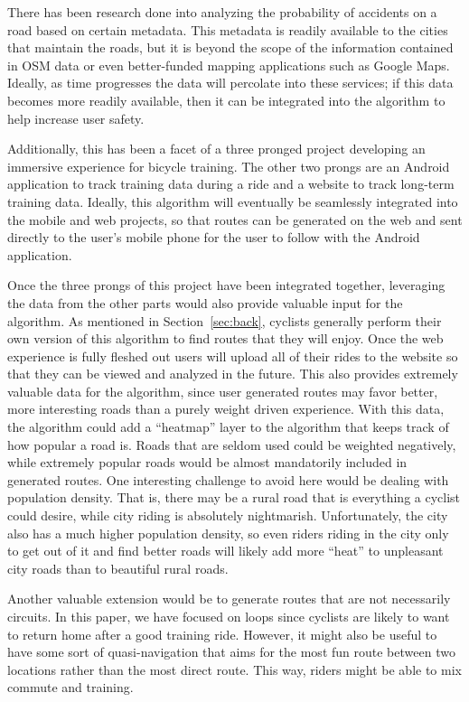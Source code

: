 \documentclass[twocolumn,12pt]{article}
\begin{document}
There has been research done into analyzing the probability of accidents
on a road based on certain metadata. This metadata is readily available to the
cities that maintain the roads, but it is beyond the scope of the information
contained in OSM data or even better-funded mapping applications such as
Google Maps. Ideally, as time progresses the data will percolate into these
services; if this data becomes more readily available, then it can be integrated
into the algorithm to help increase user safety.

Additionally, this has been a facet of a three pronged project developing an
immersive experience for bicycle training. The other two prongs are an
Android application to track training data during a ride and a website to track
long-term training data. Ideally, this algorithm will eventually be seamlessly
integrated into the mobile and web projects, so that routes can be generated
on the web and sent directly to the user's mobile phone for the user to follow
with the Android application.

Once the three prongs of this project have been integrated together, leveraging
the data from the other parts would also provide valuable input for the
algorithm. As mentioned in Section~\ref{sec:back}, cyclists generally perform
their own version of this algorithm to find routes that they will enjoy. Once
the web experience is fully fleshed out users will upload all of their rides
to the website so that they can be viewed and analyzed in the future. This also
provides extremely valuable data for the algorithm, since user generated routes
may favor better, more interesting roads than a purely weight driven experience.
With this data, the algorithm could add a ``heatmap'' layer to the algorithm
that keeps track of how popular a road is. Roads that are seldom used could be
weighted negatively, while extremely popular roads would be almost mandatorily
included in generated routes. One interesting challenge to avoid here would be
dealing with population density. That is, there may be a rural road that is
everything a cyclist could desire, while city riding is absolutely nightmarish.
Unfortunately, the city also has a much higher population density, so even
riders riding in the city only to get out of it and find better roads will
likely add more ``heat'' to unpleasant city roads than to beautiful rural
roads.

Another valuable extension would be to generate routes that are not necessarily
circuits. In this paper, we have focused on loops since cyclists are likely to
want to return home after a good training ride. However, it might also be useful
to have some sort of quasi-navigation that aims for the most fun route
between two locations rather than the most direct route. This way, riders might
be able to mix commute and training.
\end{document}
